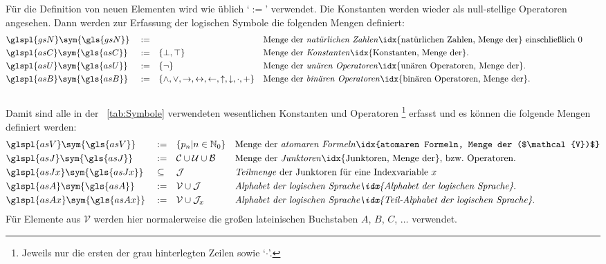 \documentclass[english,ngerman,parskip=half,headsepline,footsepline,
	fleqn,notitlepage]{scrreprt}
\makeatletter
\newcommand*{\defeq}{:=}%
\newcommand*{\ladd}{+}
\newcommand*{\lmult}{\cdot}
\newcommand*{\ltrue}{\top}%
\newcommand*{\lfalse}{\bot}%
\newcommand*{\lrep}{\leftarrow}%
\newcommand*{\limp}{\rightarrow}%
\newcommand*{\lequiv}{\leftrightarrow}%
\newcommand*{\lnand}{\uparrow}%
\newcommand*{\lnor}{\downarrow}%
\newcommand*{\gsN}{\mathbb{N}_0}%
\newcommand*{\asB}{\mathcal{B}}%
\newcommand*{\asC}{\mathcal{C}}%
\newcommand*{\asJ}{\mathcal{J}}%
\newcommand*{\asU}{\mathcal{U}}%
\newcommand*{\asV}{\mathcal{V}}%
\newcommand*{\asJx}{\mathcal{J}_x}%
\newcommand*{\formulatoleft}{&&&&&&&&&&}%
\newcommand*{\charqt}[1]{\enquote*{#1}}%
\newcommand*{\symqt}[1]{\charqt{#1}}%
\newcommand*{\textbzw}{bzw.\@ }
\newcommand*{\glsSym}[1]{\glspl{#1}\sym{\gls{#1}}}%
\makeatother
\begin{document}
	Für die Definition von neuen Elementen
	wird wie üblich \symqt{$\defeq$} verwendet.
	Die Konstanten werden wieder als null-stellige Operatoren angesehen.
	Dann werden zur Erfassung der logischen Symbole
	die folgenden Mengen definiert:
	\begin{align}
		& \glsSym{gsN}  & & \defeq & &
		& & \textrm{Menge der \emph{natürlichen Zahlen}%
		\idx{natürlichen Zahlen, Menge der} einschließlich 0}  \label{def:N} \\
		& \glsSym{asC}  & & \defeq & & \{ \lfalse, \ltrue \}
		& & \textrm{Menge der \emph{Konstanten}%
		\idx{Konstanten, Menge der}.}                          \label{def:C} \\
		& \glsSym{asU}  & & \defeq & & \{ \lnot \}
		& & \textrm{Menge der \emph{unären Operatoren}%
		\idx{unären Operatoren, Menge der}.}                   \label{def:U} \\
		& \glsSym{asB}  & & \defeq & &
		\{ \land, \lor, \limp, \lequiv, \lrep, \lnand, \lnor, \lmult, \ladd \}
		& & \textrm{Menge der \emph{binären Operatoren}%
		\idx{binären Operatoren, Menge der}.}                  \label{def:B} \\
		\formulatoleft
	\end{align}
	Damit sind alle in der \tablename~\vref{tab:Symbole} verwendeten
	wesentlichen Konstanten und Operatoren%
	\footnote{%
		Jeweils nur die ersten der grau hinterlegten Zeilen sowie \symqt{$\lmult$}.%
	}
	erfasst und es können die folgende Mengen definiert werden:
	\begin{align}
		& \glsSym{asV}  & & \defeq    & & \{ p_n | n \in \gsN \}
		& & \textrm{Menge der \emph{atomaren Formeln}%
		\idx{atomaren Formeln, Menge der ($\asV)$}}         \label{def:V} \\
		& \glsSym{asJ}  & & \defeq    & &\asC \cup \asU \cup \asB
		& & \textrm{Menge der \emph{Junktoren}%
		\idx{Junktoren, Menge der}, \textbzw Operatoren.}   \label{def:J} \\
		& \glsSym{asJx} & & \subseteq & & \asJ
		& & \textrm{\emph{Teilmenge} der Junktoren für eine Indexvariable }
		x                                                   \label{def:Bx}\\
		& \glsSym{asA}  & & \defeq    & & \asV \cup \asJ
		& & \textrm{\emph{Alphabet der logischen Sprache%
		\idx{Alphabet der logischen Sprache}}.}             \label{def:A} \\
		& \glsSym{asAx} & & \defeq    & & \asV \cup \asJx
		& & \textrm{\emph{Alphabet der logischen Sprache%
		\idx{Teil-Alphabet der logischen Sprache}}.}        \label{def:Ax} \\
	\end{align}
	Für Elemente aus $\asV$ werden hier normalerweise
	die großen lateinischen Buchstaben $A$, $B$, $C$, $\dots$ verwendet.
\end{document}
